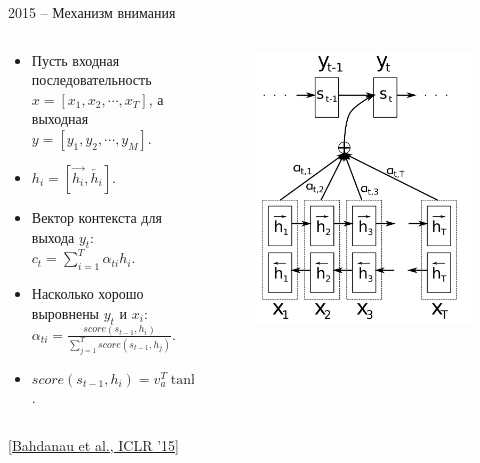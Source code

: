 \begin{frame}[c]{2015 -- Механизм внимания}

\begin{columns}
	\begin{column}{0.6\textwidth}
		\begin{itemize}
			\item Пусть входная последовательность $x=[x_1,x_2,\cdots,x_T]$, а выходная $y=[y_1,y_2,\cdots,y_M]$.
			\item $h_i = \left[\overrightarrow{h_i}, \overleftarrow{h_i}\right].$
			\item Вектор контекста для выхода $y_t$: $c_t = \sum_{i=1}^{T}\alpha_{ti}h_i$.
			\item Насколько хорошо выровнены $y_t$ и $x_i$: $\alpha_{ti} = \frac{score\left(s_{t-1}, h_i\right)}{\sum_{j=1}^{T}score\left(s_{t-1}, h_j\right)}$.
			\item $score\left(s_{t-1}, h_i\right) = v_a^T \tanh(W_a\left[s_t, h_i\right])$.
		\end{itemize}
	\end{column}
	\begin{column}{0.4\textwidth}
		\begin{figure}
			\centering
			\includegraphics[width=1.0\textwidth]{figures/attention_bahdanau_iclr2015.png}
		\end{figure}
	\end{column}
\end{columns}
\let\thefootnote\footnote{\href{http://arxiv.org/abs/1409.0473}{\color[rgb]{0.5,0.5,0.5} [Bahdanau et al., ICLR ’15]}}
\end{frame}